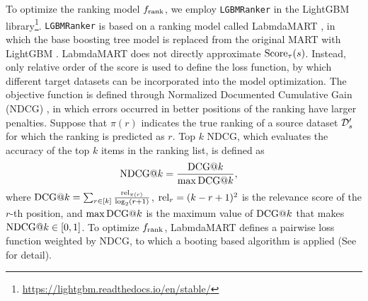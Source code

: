 To optimize the ranking model $f_{\rm rank}$, we employ {\tt LGBMRanker} in the LightGBM library\footnote{\url{https://lightgbm.readthedocs.io/en/stable/}}. 
%
{\tt LGBMRanker} is based on a ranking model called LabmdaMART \cite{burges2010ranknet}, in which the base boosting tree model is replaced from the original MART with LightGBM \cite{ke2017lightgbm}.
%
LabmdaMART does not directly approximate $\mathrm{Score}_\tau(s)$.
%
Instead, only relative order of the score is used to define the loss function, by which different target datasets can be incorporated into the model optimization.
%
The objective function is defined through Normalized Documented Cumulative Gain (NDCG) \cite{liu2011learning}, in which errors occurred in better positions of the ranking have larger penalties.
%
%
Suppose that $\pi(r)$ indicates the true ranking of a source dataset ${\mathcal D}_s^\prime$ for which the ranking is predicted as $r$. 
%
Top $k$ NDCG, which evaluates the accuracy of the top $k$ items in the ranking list, is defined as
\begin{align*}
 \mathrm{NDCG@}k &= \frac{\mathrm{DCG@}k}{\max \mathrm{DCG@}k}, 
\end{align*}
where
$\mathrm{DCG@}k = \sum_{r \in [k]} \frac{\mathrm{rel}_{\pi(r)}}{\log_2(r+1)}$,
$\mathrm{rel}_r = (k-r+1)^2$
is the relevance score of the $r$-th position, and
$\max \mathrm{DCG@}k$ is the maximum value of $\mathrm{DCG@}k$ that makes 
$\mathrm{NDCG@}k \in [0,1]$. 
%
%
To optimize $f_{\rm rank}$, LabmdaMART defines a pairwise loss function weighted by NDCG, to which a booting based algorithm is applied (See \cite{burges2010ranknet} for detail).
%



